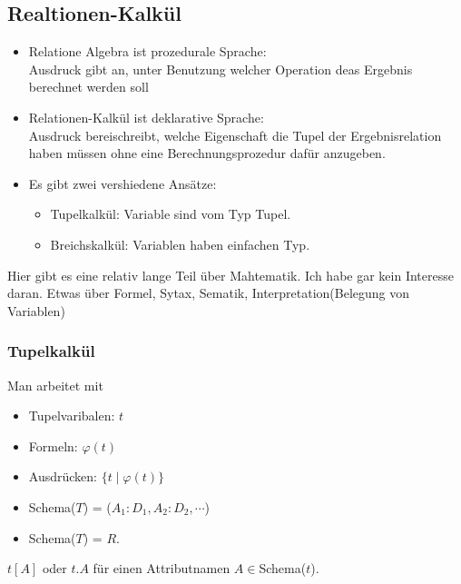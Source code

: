 \subsection{Realtionen-Kalk\"ul}
\begin{itemize}
    \item Relatione Algebra ist prozedurale Sprache:\\
    Ausdruck gibt an, unter Benutzung welcher Operation deas Ergebnis berechnet werden soll
    \item Relationen-Kalk\"ul ist deklarative Sprache:\\
    Ausdruck bereischreibt, welche Eigenschaft die Tupel der Ergebnisrelation haben m\"ussen ohne eine Berechnungsprozedur daf\"ur anzugeben.
    \item Es gibt zwei vershiedene Ans\"atze:
    \begin{itemize}
        \item Tupelkalk\"ul: Variable sind vom Typ Tupel.
        \item Breichskalk\"ul: Variablen haben einfachen Typ.
    \end{itemize}
\end{itemize}
\begin{remark}
    Hier gibt es eine relativ lange Teil \"uber Mahtematik. Ich habe gar kein Interesse daran. Etwas \"uber Formel, Sytax, Sematik, Interpretation(Belegung von Variablen)
\end{remark}

\subsubsection{Tupelkalk\"ul}
Man arbeitet mit \begin{itemize}
    \item Tupelvaribalen:  \(t\)
    \item Formeln: \(\varphi(t)\)
    \item Ausdr\"ucken: \(\{t\mid \varphi(t)\}\)
\end{itemize}
\begin{definition}
    \begin{itemize}
        \item Schema(\(T\)) = (\(A_1:D_1,A_2:D_2,\cdots\))
        \item Schema(\(T\)) = \(R\).
    \end{itemize}    
\end{definition}
\begin{remark}
    \(t[A]\) oder \(t.A\) f\"ur einen Attributnamen \(A\in \)Schema(\(t\)).
\end{remark}

